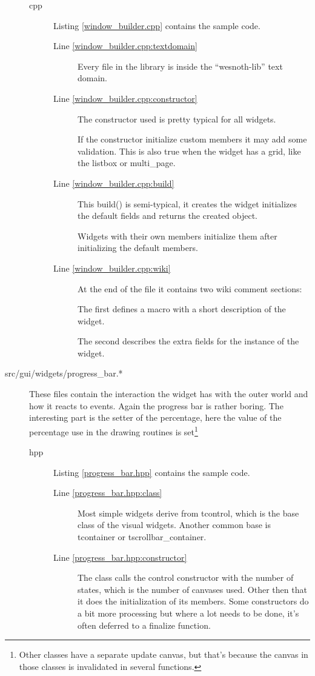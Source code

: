 \documentclass[a4paper,notitlepage]{report}
\begin{document}
\begin{description}
\begin{description}
\item[cpp] Listing \ref{window_builder.cpp} contains the sample code. 
	\begin{description}
	\item[Line \ref{window_builder.cpp:textdomain}] Every file in the library
		is inside the ``wesnoth-lib'' text domain.
	\item[Line \ref{window_builder.cpp:constructor}] The constructor used is
		pretty typical for all widgets.

		If the constructor initialize custom members it may add some validation.
		This is also true when the widget has a grid, like the listbox or
		multi\_page.
	\item[Line \ref{window_builder.cpp:build}]
		This build() is semi-typical, it creates the widget initializes the
		default fields and returns the created object.

		Widgets with their own members initialize them after initializing the
		default members.
	\item[Line \ref{window_builder.cpp:wiki}]
		At the end of the file it contains two wiki comment sections:

		The first defines a macro with a short description of the widget.

		The second describes the extra fields for the instance of the widget.
	\end{description}
\end{description}

\item[src/gui/widgets/progress\_bar.*]
	These files contain the interaction the widget has with the outer world and
	how it reacts to events. Again the progress bar is rather boring. The
	interesting part is the setter of the percentage, here the value of the
	percentage use in the drawing routines is set\footnote{Other classes have a
	separate update canvas, but that's because the canvas in those classes is
	invalidated in several functions.}

\begin{description}
\item[hpp] Listing \ref{progress_bar.hpp} contains the sample code. 
	\begin{description}
	\item[Line \ref{progress_bar.hpp:class}]
		Most simple widgets derive from tcontrol, which is the base class of the
		visual widgets. Another common base is tcontainer or
		tscrollbar\_container.

	\item[Line \ref{progress_bar.hpp:constructor}]
		The class calls the control constructor with the number of states, which
		is the number of canvases used. Other then that it does the
		initialization of its members. Some constructors do a bit more
		processing but where a lot needs to be done, it's often deferred to a
		finalize function.	


\end{description}
\end{description}
\end{description}
\end{document}
